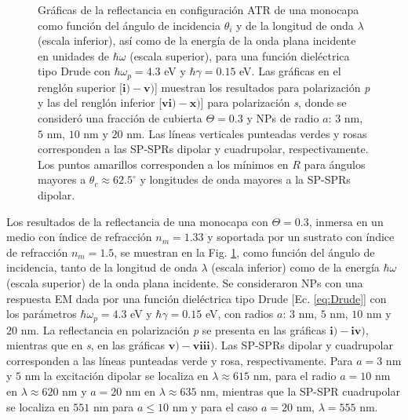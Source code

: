 \begin{figure}[b!]
\vspace*{-.5em}
	\caption{Gráficas de la reflectancia en configuración ATR de una monocapa como función del ángulo de incidencia $\theta_i$ y de la longitud de onda $\lambda$ (escala inferior), así como de la energía de la onda plana incidente en unidades de $\hbar\omega$ (escala superior), para una función dieléctrica tipo Drude con $\hbar\omega_p=4.3$ eV  y  $\hbar\gamma=0. 15$ eV.  Las gráficas   en el renglón superior [$\mathbf{i)-v)}$] muestran los resultados para  polarización \emph{p} y las del renglón inferior  [$\mathbf{vi)-x)}$]  para polarización  \emph{s}, donde se consideró una fracción de cubierta $\Theta = 0.3$ y  NPs de radio  $a$: $3$ nm, $5$ nm, $10$ nm y $20$ nm.  Las líneas verticales punteadas verdes y rosas corresponden a las SP-SPRs dipolar y  cuadrupolar, respectivamente.  Los puntos amarillos corresponden a los mínimos en $R$ para ángulos mayores a $\theta_c\approx 62.5^\circ$ y longitudes de onda mayores a la SP-SPRs dipolar.
}	\label{fig:R-RVar}	
	\end{figure}	

Los resultados de la reflectancia de una monocapa con $\Theta=0.3$, inmersa en un medio con índice de refracción $n_m = 1.33$ y soportada por un sustrato con índice de refracción $n_m= 1.5$, se muestran en la Fig.  \ref{fig:R-RVar}, como función del ángulo de incidencia, tanto de la longitud de onda $\lambda$ (escala inferior) como de la  energía $\hbar\omega$ (escala superior) de la onda plana incidente. Se consideraron NPs  con una respuesta EM dada por una función dieléctrica  tipo Drude [Ec. \eqref{eq:Drude}] con los parámetros $\hbar\omega_p =4.3$ eV y $\hbar\gamma=0.15$ eV, con radios $a$: $3$ nm, $5$ nm, $10$ nm y $20$ nm. La reflectancia en polarización \emph{p} se presenta en las gráficas $\mathbf{i)-iv)}$, mientras que en \emph{s}, en las gráficas $\mathbf{v)-viii)}$. Las SP-SPRs dipolar y cuadrupolar corresponden a las líneas punteadas verde y rosa, respectivamente. Para $a = 3$ nm y $5$ nm la excitación dipolar se localiza en $\lambda\approx 615$ nm, para el radio  $a = 10$ nm en $\lambda\approx 620$ nm y $a=20$ nm en $\lambda\approx 635$ nm, mientras que la SP-SPR cuadrupolar se localiza en $551$ nm para $a\leq 10$ nm y para el caso  $a=20$ nm, $\lambda = 555$ nm.	
	
